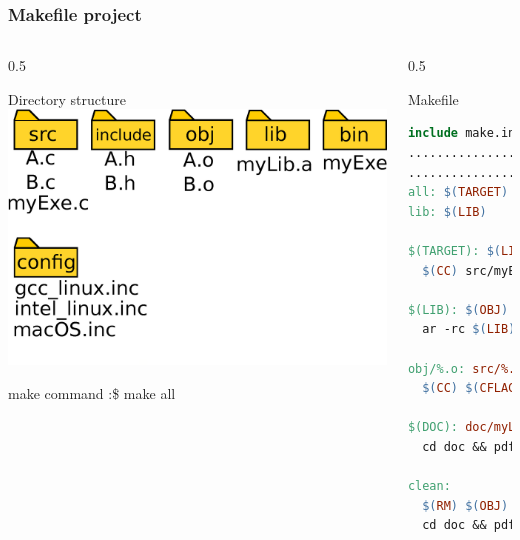 \documentclass{beamer}
\begin{document}
\begin{frame}[fragile] \frametitle{Makefile project}
  \begin{columns}
    \begin{column}{0.5\textwidth}
      \begin{block}{Directory  structure}
        \includegraphics[width=\textwidth]{dir_config}
      \end{block}
        \begin{block}{make command}
          \centering
          :\$ make all
        \end{block} 
    \end{column}
    \begin{column}{0.5\textwidth}
      \begin{block}{Makefile}
        \tiny{\begin{lstlisting}[language=make]
include make.inc            
................
...............
all: $(TARGET)
lib: $(LIB)

$(TARGET): $(LIB) src/myExe.c
  $(CC) src/myExe.c  $(CFLAGS) $(LIBS) -o $@

$(LIB): $(OBJ)
  ar -rc $(LIB) $(OBJ)

obj/%.o: src/%.c
  $(CC) $(CFLAGS)  -c $< -o $@

$(DOC): doc/myLib.tex
  cd doc && pdflatex -pdf myLib.tex

clean:
  $(RM) $(OBJ) $(TARGET) 
  cd doc && pdflatex -c myLib.tex
            \end{lstlisting}
        }
      \end{block}
    \end{column}
  \end{columns}
\end{frame}
\end{document}
